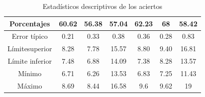 \documentclass[a4paper,11pt]{article}
\begin{document}
\begin{table}[h!]
\begin{tabular}{c|c|c|c|c|c|c|}
\multicolumn{1}{|c|}{Porcentajes}       & 60.62                                                        & 56.38                                                        & 57.04                                                      & 62.23                                                        & 68                                                           & 58.42                                                      \\ \hline
\multicolumn{1}{|c|}{Error típico}      & 0.21                                                         & 0.33                                                         & 0.38                                                       & 0.36                                                         & 0.28                                                         & 0.83                                                       \\ \hline
\multicolumn{1}{|c|}{Límite\footnotemark superior}   & 8.28                                                         & 7.78                                                         & 15.57                                                      & 8.80                                                         & 9.40                                                         & 16.81                                                      \\ \hline
\multicolumn{1}{|c|}{Límite inferior}   & 7.48                                                         & 6.88                                                         & 14.09                                                      & 7.38                                                         & 8.28                                                         & 13.57                                                      \\ \hline
\multicolumn{1}{|c|}{Mínimo}            & 6.71                                                         & 6.26                                                         & 13.53                                                      & 6.83                                                         & 7.25                                                         & 11.43                                                      \\ \hline
\multicolumn{1}{|c|}{Máximo}            & 8.69                                                         & 8.44                                                         & 16.58                                                      & 9.6                                                          & 9.62                                                         & 19                                                         \\ \hline
\end{tabular}
\caption{Estadísticos descriptivos de los aciertos}
\end{table}
\end{document}
